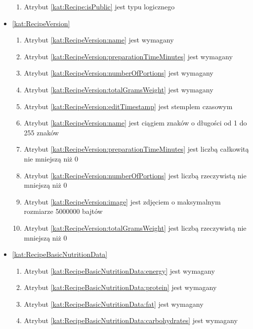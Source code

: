 \begin{itemize}[label={\textbf{Ograniczenia dla}}, wide, labelwidth=!, labelindent=0pt]
\begin{enumerate}[label={\textbf{OGR/\protect\threedigits{\arabic{enumi}}}}, wide, labelwidth=!, align=left, leftmargin=3cm, resume]
        \item Atrybut \ref{kat:Recipe:isPublic} jest typu logicznego
    \end{enumerate}

    \item\ref{kat:RecipeVersion}
    \begin{enumerate}[label={\textbf{OGR/\protect\threedigits{\arabic{enumi}}}}, wide, labelwidth=!, align=left, leftmargin=3cm, resume]
        \item Atrybut \ref{kat:RecipeVersion:name} jest wymagany
        \item Atrybut \ref{kat:RecipeVersion:preparationTimeMinutes} jest wymagany
        \item Atrybut \ref{kat:RecipeVersion:numberOfPortions} jest wymagany
        \item Atrybut \ref{kat:RecipeVersion:totalGramsWeight} jest wymagany

        \item Atrybut \ref{kat:RecipeVersion:editTimestamp} jest stemplem czasowym
        \item Atrybut \ref{kat:RecipeVersion:name} jest ciągiem znaków o długości od 1 do 255 znaków
        \item Atrybut \ref{kat:RecipeVersion:preparationTimeMinutes} jest liczbą całkowitą nie mniejszą niż 0
        \item Atrybut \ref{kat:RecipeVersion:numberOfPortions} jest liczbą rzeczywistą nie mniejszą niż 0
        \item Atrybut \ref{kat:RecipeVersion:image} jest zdjęciem o maksymalnym rozmiarze 5000000 bajtów
        \item Atrybut \ref{kat:RecipeVersion:totalGramsWeight} jest liczbą rzeczywistą nie mniejszą niż 0
    \end{enumerate}

    \item\ref{kat:RecipeBasicNutritionData}
    \begin{enumerate}[label={\textbf{OGR/\protect\threedigits{\arabic{enumi}}}}, wide, labelwidth=!, align=left, leftmargin=3cm, resume]
        \item Atrybut \ref{kat:RecipeBasicNutritionData:energy} jest wymagany
        \item Atrybut \ref{kat:RecipeBasicNutritionData:protein} jest wymagany
        \item Atrybut \ref{kat:RecipeBasicNutritionData:fat} jest wymagany
        \item Atrybut \ref{kat:RecipeBasicNutritionData:carbohydrates} jest wymagany


\end{enumerate}
\end{itemize}

